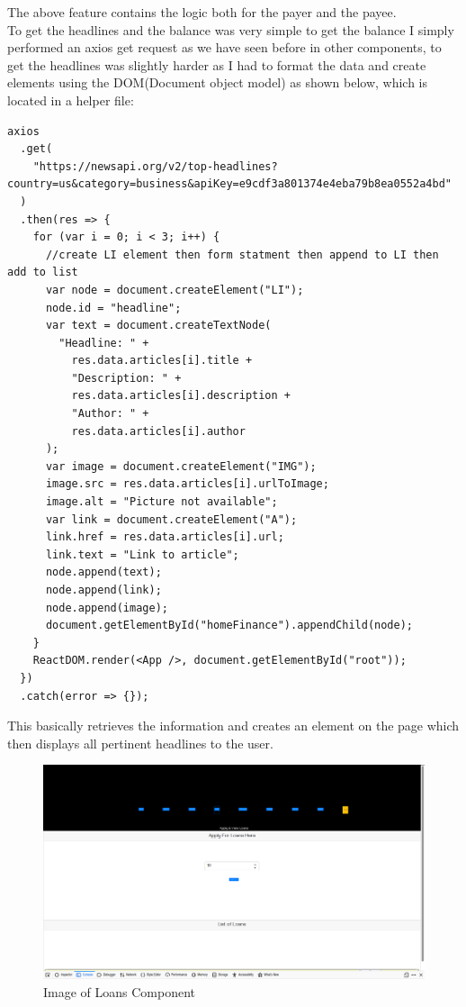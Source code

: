 The above feature contains the logic both for the payer and the payee.
\\
To get the headlines and the balance was very simple to get the balance I simply performed an axios get request as we have seen before in other components, to get the headlines was slightly harder as I had to format the data and create elements using the DOM(Document object model) as shown below, which is located in a helper file:
\begin{verbatim}
axios
  .get(
    "https://newsapi.org/v2/top-headlines?country=us&category=business&apiKey=e9cdf3a801374e4eba79b8ea0552a4bd"
  )
  .then(res => {
    for (var i = 0; i < 3; i++) {
      //create LI element then form statment then append to LI then add to list
      var node = document.createElement("LI");
      node.id = "headline";
      var text = document.createTextNode(
        "Headline: " +
          res.data.articles[i].title +
          "Description: " +
          res.data.articles[i].description +
          "Author: " +
          res.data.articles[i].author
      );
      var image = document.createElement("IMG");
      image.src = res.data.articles[i].urlToImage;
      image.alt = "Picture not available";
      var link = document.createElement("A");
      link.href = res.data.articles[i].url;
      link.text = "Link to article";
      node.append(text);
      node.append(link);
      node.append(image);
      document.getElementById("homeFinance").appendChild(node);
    }
    ReactDOM.render(<App />, document.getElementById("root"));
  })
  .catch(error => {});
\end{verbatim}
This basically retrieves the information and creates an element on the page which then displays all pertinent headlines to the user.
\\
\begin{figure}[H]
\includegraphics[width=\textwidth]{img/loanscomponent.png}
\caption{Image of Loans Component}
\label{fig:Image of loans component}
\end{figure}
